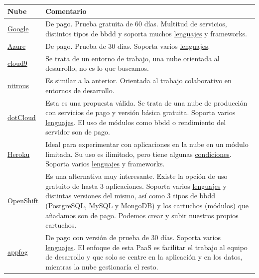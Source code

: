 \begin{table}[H]
	\centering
	\begin{tabular}{p{2cm} p{8cm}}
	\hline
	\textbf{Nube} & \textbf{Comentario} \\
	\hline \hline
	\href{https://cloud.google.com/free-trial/?hl=es&_ga=1.261030148.846668794.1427305506}{Google} & De pago. Prueba gratuita de 60 días. Multitud de servicios, distintos tipos de bbdd y soporta muchos \href{https://cloud.google.com/launcher/?hl=es}{lenguajes} y frameworks. \\
	\hline
	\href{http://azure.microsoft.com/en-us/}{Azure} & De pago. Prueba de 30 días. Soporta varios \href{https://tryappservice.azure.com/}{lenguajes}. \\
	\hline
	\href{https://c9.io/}{cloud9} & Se trata de un entorno de trabajo, una nube orientada al desarrollo, no es lo que buscamos. \\
	\hline
	\href{https://www.nitrous.io/}{nitrous} & Es similar a la anterior. Orientada al trabajo colaborativo en entornos de desarrollo. \\
	\hline
	\href{https://www.dotcloud.com/}{dotCloud} & Esta es una propuesta válida. Se trata de una nube de producción con servicios de pago y versión básica gratuita. Soporta varios \href{https://www.dotcloud.com/dev-center/guides}{lenguajes}. El uso de módulos como bbdd o rendimiento del servidor son de pago. \\
	\hline
	\href{https://www.heroku.com/}{Heroku} & Ideal para experimentar con aplicaciones en la nube en un módulo limitada. Su uso es ilimitado, pero tiene algunas \href{https://www.heroku.com/pricing}{condiciones}. Soporta varios \href{https://devcenter.heroku.com/categories/language-support}{lenguajes} y frameworks. \\
	\hline
	\href{https://www.openshift.com/}{OpenShift} & Es una alternativa muy interesante. Existe la opción de uso gratuito de hasta 3 aplicaciones. Soporta varios \href{https://www.openshift.com/promotions/try-openshift?sc_cid=70160000000UJArAAO&gclid=CMqo54DUy8cCFSMcwwodxLoGGQ}{lenguajes} y distintas versiones del mismo, así como 3 tipos de bbdd (PostgreSQL, MySQL y MongoDB) y los cartuchos (módulos) que añadamos son de pago. Podemos crear y subir nuestros propios cartuchos. \\
	\hline
	\href{https://www.appfog.com/}{appfog} & De pago con versión de prueba de 30 días. Soporta varios \href{https://www.ctl.io/appfog/}{lenguajes}. El enfoque de esta PaaS es facilitar el trabajo al equipo de desarrollo y que solo se centre en la aplicación y en los datos, mientras la nube gestionaría el resto. \\

\end{tabular}
\end{table}
